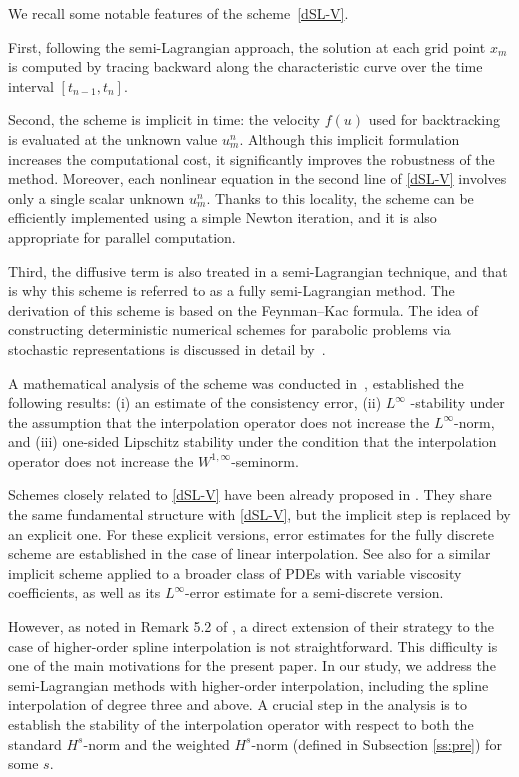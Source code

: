 \documentclass[10pt,a4paper,tbtags,leqno]{amsart}
\theoremstyle{definition}
\numberwithin{equation}{section}
\begin{document}
We recall some notable features of the scheme~\eqref{dSL-V}. 

First, following the semi-Lagrangian approach, the solution at each grid point $ x_m $ is computed by tracing backward along the characteristic curve over the time interval $ [t_{n-1}, t_n] $. 

Second, the scheme is implicit in time: the velocity $ f(u) $ used for backtracking is evaluated at the unknown value $ u_m^n $. Although this implicit formulation increases the computational cost, it significantly improves the robustness of the method. Moreover, each nonlinear equation in the second line of \eqref{dSL-V} involves only a single scalar unknown $ u_m^n $. Thanks to this locality, the scheme can be efficiently implemented using a simple Newton iteration, and it is also appropriate for parallel computation. 

Third, the diffusive term is also treated in a semi-Lagrangian technique, and that is why this scheme is referred to as a fully semi-Lagrangian method. The derivation of this scheme is based on the Feynman--Kac formula. The idea of constructing deterministic numerical schemes for parabolic problems via stochastic representations is discussed in detail by~\cite{02Mi}. 

A mathematical analysis of the scheme was conducted in~\cite{25Fe}, established the following results: (i) an estimate of the consistency error, (ii) $ L^\infty $ -stability under the assumption that the interpolation operator does not increase the $ L^\infty $-norm, and (iii) one-sided Lipschitz stability under the condition that the interpolation operator does not increase the $ W^{1,\infty} $-seminorm. 

Schemes closely related to \eqref{dSL-V} have been already proposed in \cite{00MiTr,01MiTr,02Mi}. They share the same fundamental structure with \eqref{dSL-V}, but the implicit step is replaced by an explicit one. For these explicit versions, error estimates for the fully discrete scheme are established in the case of linear interpolation. See also \cite{00MiTr} for a similar implicit scheme applied to a broader class of PDEs with variable viscosity coefficients, as well as its $ L^\infty $-error estimate for a semi-discrete version. 

However, as noted in Remark 5.2 of \cite{02Mi}, a direct extension of their strategy to the case of higher-order spline interpolation is not straightforward. This difficulty is one of the main motivations for the present paper. In our study, we address the semi-Lagrangian methods with higher-order interpolation, including the spline interpolation of degree three and above. A crucial step in the analysis is to establish the stability of the interpolation operator with respect to both the standard $ H^s $-norm and the weighted $ H^s $-norm (defined in Subsection \ref{ss:pre}) for some $ s $. 
\end{document}
